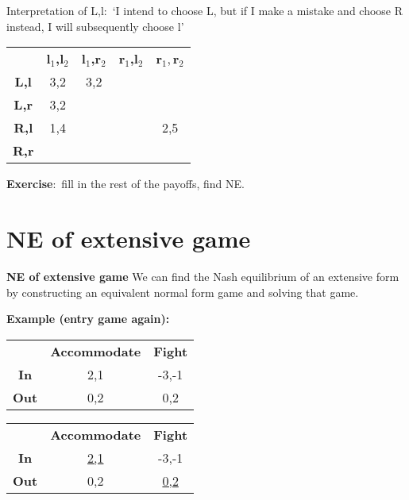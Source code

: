 Interpretation of L,l:\ `I intend to choose L, but if I make a mistake and
choose R instead, I will subsequently choose l'




\begin{tabular}{ccccc}
& \textbf{l}$_{1}$\textbf{,l}$_{2}$ & \textbf{l}$_{1}$\textbf{,r}$_{2}$ &
\textbf{r}$_{1}$\textbf{,l}$_{2}$ & \textbf{r}$_{1},$\textbf{r}$_{2}$ \\
\textbf{L,l} & 3,2 & 3,2 &  &  \\
\textbf{L,r} & 3,2 &  &  &  \\
\textbf{R,l} & 1,4 &  &  & 2,5 \\
\textbf{R,r} &  &  &  &
\end{tabular}

\textbf{Exercise}:\ fill in the rest of the payoffs, find NE.\bigskip


\section{NE of extensive game}

\textbf{NE of extensive game}
We can find the Nash equilibrium of an extensive form by constructing an
equivalent normal form game and solving that game.



\textbf{Example (entry game again):}


\begin{tabular}{ccc}
& \textbf{Accommodate} & \textbf{Fight} \\
\textbf{In} & 2,1 & -3,-1 \\
\textbf{Out} & 0,2 & 0,2%
\end{tabular}

\bigskip

\begin{tabular}{ccc}
& \textbf{Accommodate} & \textbf{Fight} \\
\textbf{In} & \underline{2,1} & -3,-1 \\
\textbf{Out} & 0,2 & \underline{0,2}%
\end{tabular}




